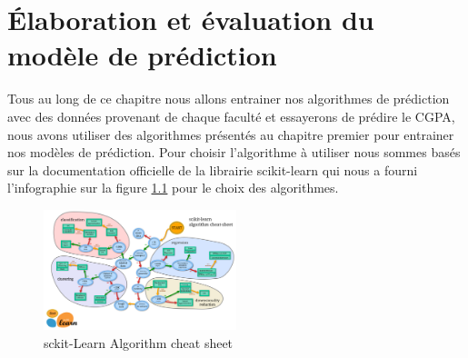 \chapter{Élaboration  et évaluation du modèle de prédiction }
Tous au long de ce chapitre nous allons entrainer nos algorithmes de prédiction avec des données provenant de chaque faculté et essayerons de prédire le CGPA, nous  avons utiliser des algorithmes présentés au chapitre premier pour entrainer nos modèles de prédiction.
Pour choisir l'algorithme à utiliser nous sommes basés sur la documentation officielle de la librairie scikit-learn \cite{pedregosa2011scikit} qui nous a fourni l'infographie sur la figure \ref{fig:skLearn1} pour le choix des algorithmes. \\

\begin{figure}[ht]
	\centering
	\includegraphics[width=0.5\textwidth]{fig/sckikLearnCheatSheet.png}
	\caption{sckit-Learn Algorithm cheat sheet }
	\label{fig:skLearn1}
\end{figure}  

